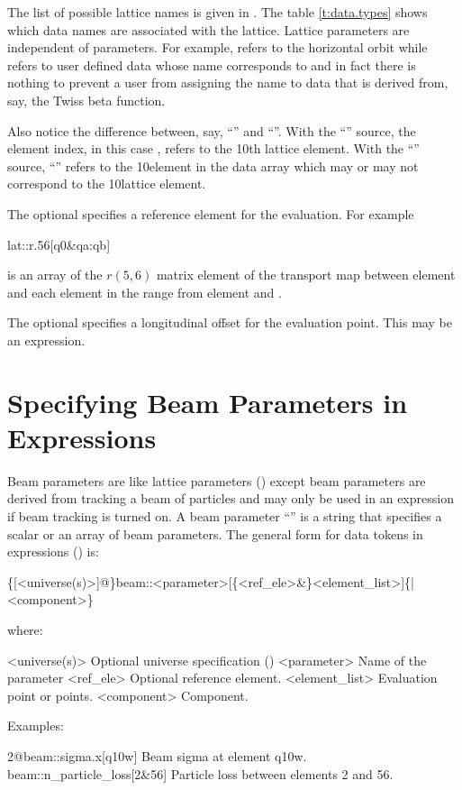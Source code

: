 The list of possible lattice  names is given in . The table
\ref{t:data.types} shows which data names are associated with the lattice. Lattice parameters are
independent of  parameters. For example,  refers to the horizontal orbit
while  refers to user defined data whose name corresponds to  and in
fact there is nothing to prevent a user from assigning the name  to data that is derived
from, say, the Twiss beta function.

Also notice the difference between, say, ``'' and ``''.
With the ``'' source, the element index, in this case , refers to the 10th lattice
element. With the ``'' source, ``'' refers to the 10\Th element in the
 data array which may or may not correspond to the 10\Th lattice element.

The optional  specifies a reference element for the evaluation. For example
\begin{example}
  lat::r.56[q0\&qa:qb]
\end{example}  
is an array of the $r(5,6)$ matrix element of the transport map between element  and each
element in the range from element  and .

The optional  specifies a longitudinal offset for the evaluation point. This may be
an expression.

\section{Specifying Beam Parameters in Expressions}
\label{s:beam.token}

Beam parameters are like lattice parameters () except beam parameters are derived
from tracking a beam of particles and may only be used in an expression if beam tracking is turned
on.  A beam parameter ``'' is a string that specifies a scalar or an array of beam
parameters. The general form for data tokens in expressions () is:
\begin{example}
  \{[<universe(s)>]@\}beam::<parameter>[\{<ref_ele>&\}<element_list>]\{|<component>\}
\end{example}
where:
\begin{example}
  <universe(s)>       Optional universe specification ()
  <parameter>         Name of the parameter
  <ref_ele>           Optional reference element.
  <element_list>      Evaluation point or points.
  <component>         Component. 
\end{example}
Examples:
\begin{example}
  2@beam::sigma.x[q10w]           Beam sigma at element q10w.
  beam::n_particle_loss[2&56]     Particle loss between elements 2 and 56.
\end{example}

